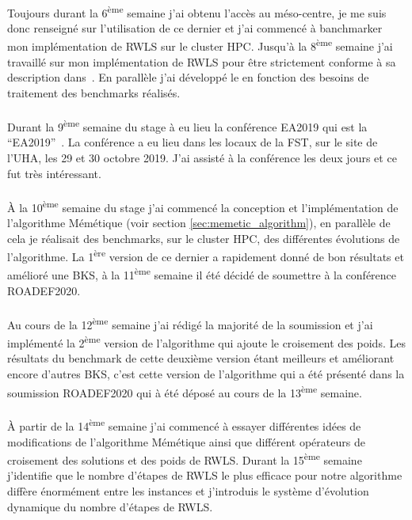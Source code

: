 \documentclass[a4paper,11pt,twoside,french,report]{../common/simplem}
\begin{document}
				\paragraph*{}
					Toujours durant la 6\textsuperscript{ème} semaine j'ai obtenu l'accès au méso-centre, je me suis donc renseigné sur l'utilisation de ce dernier et j'ai commencé à banchmarker mon implémentation de \gls{RWLS} sur le cluster \gls{HPC}. Jusqu'à la 8\textsuperscript{ème} semaine j'ai travaillé sur mon implémentation de \gls{RWLS} pour être strictement conforme à sa description dans~\cite{Gao2015}. En parallèle j'ai développé le \printer{} en fonction des besoins de traitement des benchmarks réalisés.
				\paragraph*{}
					Durant la 9\textsuperscript{ème} semaine du stage à eu lieu la conférence \acrshort{EA2019} qui est la ``\acrlong{EA2019}''~\cite{EA2019}. La conférence a eu lieu dans les locaux de la \gls{FST}, sur le site de l'\gls{UHA}, les 29 et 30 octobre 2019. J'ai assisté à la conférence les deux jours et ce fut très intéressant.
				\paragraph*{}
					À la 10\textsuperscript{ème} semaine du stage j'ai commencé la conception et l'implémentation de l'algorithme Mémétique (voir section \ref{sec:memetic_algorithm}), en parallèle de cela je réalisait des benchmarks, sur le cluster \gls{HPC}, des différentes évolutions de l'algorithme. La 1\textsuperscript{ère} version de ce dernier a rapidement donné de bon résultats et amélioré une \gls{BKS}, à la 11\textsuperscript{ème} semaine il été décidé de soumettre à la conférence \acrshort{ROADEF2020}.
				\paragraph*{}
					Au cours de la 12\textsuperscript{ème} semaine j'ai rédigé la majorité de la soumission et j'ai implémenté la 2\textsuperscript{ème} version de l'algorithme qui ajoute le croisement des poids. Les résultats du benchmark de cette deuxième version étant meilleurs et améliorant encore d'autres \gls{BKS}, c'est cette version de l'algorithme qui a été présenté dans la soumission \acrshort{ROADEF2020} qui à été déposé au cours de la 13\textsuperscript{ème} semaine.
				\paragraph*{}
					À partir de la 14\textsuperscript{ème} semaine j'ai commencé à essayer différentes idées de modifications de l'algorithme Mémétique ainsi que différent opérateurs de croisement des solutions et des poids de \gls{RWLS}. Durant la 15\textsuperscript{ème} semaine j'identifie que le nombre d'étapes de \gls{RWLS} le plus efficace pour notre algorithme diffère énormément entre les instances et j'introduis le système d'évolution dynamique du nombre d'étapes de \gls{RWLS}.
\end{document}
